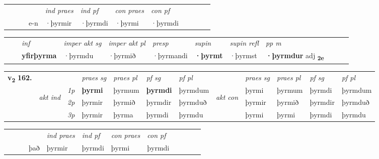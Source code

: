 \begin{tabular}{llllllllllll}
 & &  & &  \textit{ind praes} & \textit{ind pf} & \textit{con praes} & \textit{con pf} \\*
&  & & e-n & ·þyrmir & ·þyrmdi & ·þyrmi & ·þyrmdi \\*
\cmidrule{5-9}
\end{tabular}


\begin{tabular}{llllllllllll}
 & & \textit{inf} & \textit{imper akt sg} & \textit{imper akt pl}   & \textit{presp} & \textit{supin} & \textit{supin refl} & \textit{pp m}     \\*
  & & \textbf{yfirþyrma} & ·þyrmdu  & ·þyrmið   & ·þyrmandi &  \textbf{·þyrmt} & ·þyrmst & \textbf{·þyrmdur} adj \textbf{\textsubscript{2e}} \\*
\cmidrule{1-12}
\end{tabular}



\begin{tabular}{llllllllllll} \toprule
\multirow{4}{*}{{{\textbf{v{\textsubscript{2}}} \Large{\textbf{162.}}}}}  & &   &  \textit{praes sg}  & \textit{praes pl}  &\textit{ pf sg} & \textit{pf pl} &  &  \textit{praes sg}  & \textit{praes pl}  & \textit{pf sg} & \textit{pf pl } \\*
	\cmidrule{4-7} \cmidrule{9-12}
 & \multirow{3}{*}{\begin{turn}{90}\textit{akt ind}\end{turn}} & {\textit{1p}} & \textbf{þyrmi} & þyrmum    & \textbf{þyrmdi} & þyrmdum & \multirow{3}{*}{\begin{turn}{90}\textit{akt con}\end{turn}} &þyrmi & þyrmum & þyrmdi & þyrmdum\\*
& &  {\textit{2p}} &  þyrmir  & þyrmið   & þyrmdir & þyrmduð & & þyrmir & þyrmið & þyrmdir & þyrmduð \\*
& &  {\textit{3p}} & þyrmir & þyrma   & þyrmdi & þyrmdu & & þyrmi & þyrmi& þyrmdi & þyrmdu  \\*
\cmidrule{4-7} \cmidrule{9-12}
\end{tabular}


\begin{tabular}{llllllllllll}
 & &  & &  \textit{ind praes} & \textit{ind pf} & \textit{con praes} & \textit{con pf} \\*
&  & & það & þyrmir & þyrmdi & þyrmi & þyrmdi \\*
\cmidrule{5-9}
\end{tabular}


